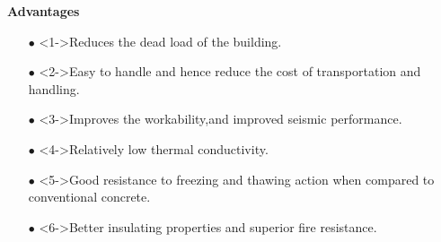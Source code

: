 \documentclass[aspectratio=169]{beamer}
\begin{document}
\begin{frame}{\textbf{Advantages }}
      \begin{itemize}
          \large\item[$\bullet$] <1->Reduces the dead load of the building.
           \vspace{0.4cm}
          \large\item[$\bullet$]<2->Easy to handle and hence reduce the cost of transportation and handling.
           \vspace{0.4cm}
          \large\item[$\bullet$] <3->Improves the workability,and improved seismic performance.
         \vspace{0.4cm}
         \item[$\bullet$]<4->Relatively low thermal conductivity.
         \vspace{0.4cm}
         \item[$\bullet$]<5->Good resistance to freezing and thawing action when compared to conventional concrete.
         \vspace{0.4cm}
         \item[$\bullet$]<6->Better insulating properties and 
        superior fire resistance.
          \end{itemize}
  \end{frame}
\end{document}
